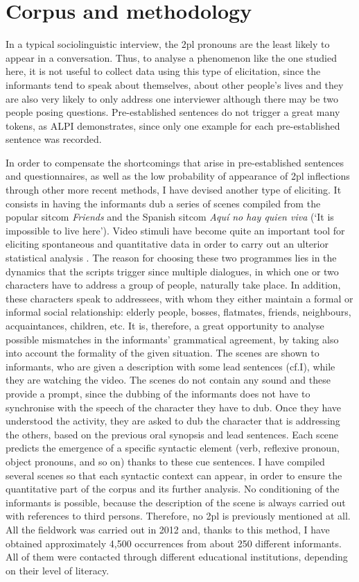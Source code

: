 \documentclass[output=paper]{LSP/langsci}
\begin{document}
\section{Corpus and methodology}
In a typical sociolinguistic interview, the 2pl pronouns are the least likely to appear in a conversation. Thus, to analyse a phenomenon like the one studied here, it is not useful to collect data using this type of elicitation, since the informants tend to speak about themselves, about other people’s lives and they are also very likely to only address one interviewer although there may be two people posing questions. Pre-established sentences do not trigger a great many tokens, as ALPI demonstrates, since only one example for each pre-established sentence was recorded.

In order to compensate the shortcomings that arise in pre-established sentences and questionnaires, as well as the low probability of appearance of 2pl inflections through other more recent methods, I have devised another type of eliciting. It consists in having the informants dub a series of scenes compiled from the popular sitcom \textit{Friends} and the Spanish sitcom \textit{Aquí no hay quien viva} (‘It is impossible to live here’). Video stimuli have become quite an important tool for eliciting spontaneous and quantitative data in order to carry out an ulterior statistical analysis \citep{chelliah_handbook_2011,mallinson_data_2013,thieberger_oxford_2011,lara_tratamientos_2015}. The reason for choosing these two programmes lies in the dynamics that the scripts trigger since multiple dialogues, in which one or two characters have to address a group of people, naturally take place. In addition, these characters speak to addressees, with whom they either maintain a formal or informal social relationship: elderly people, bosses, flatmates, friends, neighbours, acquaintances, children, etc. It is, therefore, a great opportunity to analyse possible mismatches in the informants’ grammatical agreement, by taking also into account the formality of the given situation. The scenes are shown to informants, who are given a description with some lead sentences (cf.I), while they are watching the video. The scenes do not contain any sound and these provide a prompt, since the dubbing of the informants does not have to synchronise with the speech of the character they have to dub. Once they have understood the activity, they are asked to dub the character that is addressing the others, based on the previous oral synopsis and lead sentences. Each scene predicts the emergence of a specific syntactic element (verb, reflexive pronoun, object pronouns, and so on) thanks to these cue sentences. I have compiled several scenes so that each syntactic context can appear, in order to ensure the quantitative part of the corpus and its further analysis. No conditioning of the informants is possible, because the description of the scene is always carried out with references to third persons. Therefore, no 2pl is previously mentioned at all. All the fieldwork was carried out in 2012 and, thanks to this method, I have obtained approximately 4,500 occurrences from about 250 different informants. All of them were contacted through different educational institutions, depending on their level of literacy.
\end{document}
